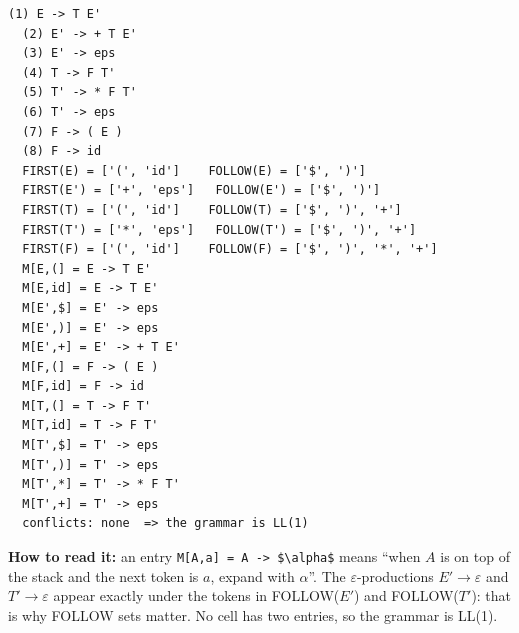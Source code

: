\documentclass[10pt,a4paper,openany,oneside]{report}
\begin{document}
\begin{lstlisting}[style=out,title={Captured output}]
  (1) E -> T E'
  (2) E' -> + T E'
  (3) E' -> eps
  (4) T -> F T'
  (5) T' -> * F T'
  (6) T' -> eps
  (7) F -> ( E )
  (8) F -> id
  FIRST(E) = ['(', 'id']    FOLLOW(E) = ['$', ')']
  FIRST(E') = ['+', 'eps']   FOLLOW(E') = ['$', ')']
  FIRST(T) = ['(', 'id']    FOLLOW(T) = ['$', ')', '+']
  FIRST(T') = ['*', 'eps']   FOLLOW(T') = ['$', ')', '+']
  FIRST(F) = ['(', 'id']    FOLLOW(F) = ['$', ')', '*', '+']
  M[E,(] = E -> T E'
  M[E,id] = E -> T E'
  M[E',$] = E' -> eps
  M[E',)] = E' -> eps
  M[E',+] = E' -> + T E'
  M[F,(] = F -> ( E )
  M[F,id] = F -> id
  M[T,(] = T -> F T'
  M[T,id] = T -> F T'
  M[T',$] = T' -> eps
  M[T',)] = T' -> eps
  M[T',*] = T' -> * F T'
  M[T',+] = T' -> eps
  conflicts: none  => the grammar is LL(1)
\end{lstlisting}
\textbf{How to read it:} an entry \texttt{M[A,a] = A -> \$\textbackslash{}alpha\$} means ``when $A$ is on top of the stack and the next token is $a$, expand with $\alpha$''. The $\varepsilon$-productions $E'\to\varepsilon$ and $T'\to\varepsilon$ appear exactly under the tokens in FOLLOW($E'$) and FOLLOW($T'$): that is why FOLLOW sets matter. No cell has two entries, so the grammar is LL(1).
\end{document}
